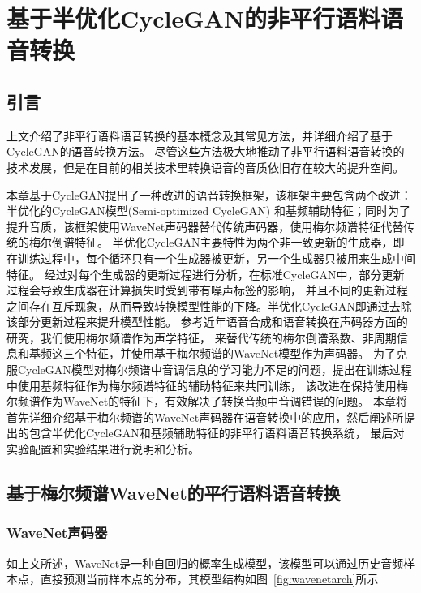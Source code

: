 \chapter{基于半优化CycleGAN的非平行语料语音转换}

\section{引言}
上文介绍了非平行语料语音转换的基本概念及其常见方法，并详细介绍了基于CycleGAN的语音转换方法。
尽管这些方法极大地推动了非平行语料语音转换的技术发展，但是在目前的相关技术里转换语音的音质依旧存在较大的提升空间。

本章基于CycleGAN提出了一种改进的语音转换框架，该框架主要包含两个改进：半优化的CycleGAN模型(Semi-optimized CycleGAN)
和基频辅助特征；同时为了提升音质，该框架使用WaveNet声码器替代传统声码器，使用梅尔频谱特征代替传统的梅尔倒谱特征。
半优化CycleGAN主要特性为两个非一致更新的生成器，即在训练过程中，每个循环只有一个生成器被更新，另一个生成器只被用来生成中间特征。
经过对每个生成器的更新过程进行分析，在标准CycleGAN中，部分更新过程会导致生成器在计算损失时受到带有噪声标签的影响，
并且不同的更新过程之间存在互斥现象，从而导致转换模型性能的下降。半优化CycleGAN即通过去除该部分更新过程来提升模型性能。
参考近年语音合成和语音转换在声码器方面的研究，我们使用梅尔频谱作为声学特征，
来替代传统的梅尔倒谱系数、非周期信息和基频这三个特征，并使用基于梅尔频谱的WaveNet模型作为声码器。
为了克服CycleGAN模型对梅尔频谱中音调信息的学习能力不足的问题，提出在训练过程中使用基频特征作为梅尔频谱特征的辅助特征来共同训练，
该改进在保持使用梅尔频谱作为WaveNet的特征下，有效解决了转换音频中音调错误的问题。
本章将首先详细介绍基于梅尔频谱的WaveNet声码器在语音转换中的应用，然后阐述所提出的包含半优化CycleGAN和基频辅助特征的非平行语料语音转换系统，
最后对实验配置和实验结果进行说明和分析。

\section{基于梅尔频谱WaveNet的平行语料语音转换}
\subsection{WaveNet声码器}
如上文所述，WaveNet是一种自回归的概率生成模型，该模型可以通过历史音频样本点，直接预测当前样本点的分布，其模型结构如图~\ref{fig:wavenetarch}所示

